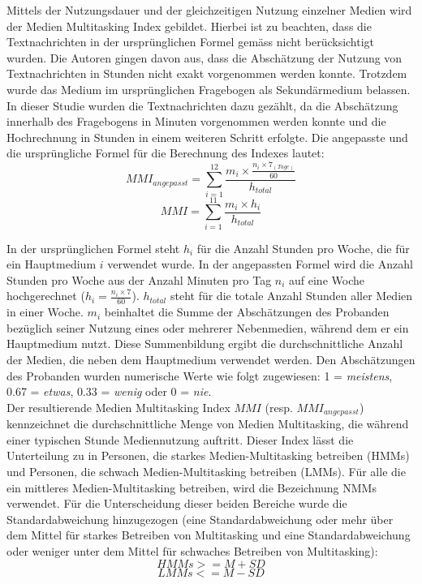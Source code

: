 Mittels der Nutzungsdauer und der gleichzeitigen Nutzung einzelner Medien wird der Medien Multitasking Index gebildet. Hierbei ist zu beachten, dass die Textnachrichten in der ursprünglichen Formel gemäss \cite{Ophir2009}  nicht berücksichtigt wurden. Die Autoren gingen davon aus, dass die Abschätzung der Nutzung von Textnachrichten in Stunden nicht exakt vorgenommen werden konnte. Trotzdem wurde das Medium im ursprünglichen Fragebogen als Sekundärmedium belassen. In dieser Studie wurden die Textnachrichten dazu gezählt, da die Abschätzung innerhalb des Fragebogens in Minuten vorgenommen werden konnte und die Hochrechnung in Stunden in einem weiteren Schritt erfolgte. Die angepasste und die ursprüngliche Formel für die Berechnung des Indexes lautet:
\begin{equation}\label{formel.mmiext}
    MMI_{angepasst}=\sum_{i=1}^{12} \frac{m_{i} \times \frac{n_{i} \times 7_{(Tage)}}{60}}{h_{total}}
\end{equation}
\begin{equation}\label{formel.mmi}
    MMI=\sum_{i=1}^{11} \frac{m_{i} \times h_{i}}{h_{total}}
\end{equation}

In der ursprünglichen Formel steht \(h_{i}\) für die Anzahl Stunden pro Woche, die für ein Hauptmedium \(i\) verwendet wurde. In der angepassten Formel wird die Anzahl Stunden pro Woche aus der Anzahl Minuten pro Tag \(n_i\) auf eine Woche hochgerechnet (\(h_{i}=\frac{n_{i} \times 7}{60}\)). \(h_{total}\) steht für die totale Anzahl Stunden aller Medien in einer Woche. \(m_i\) beinhaltet die Summe der Abschätzungen des Probanden bezüglich seiner Nutzung eines oder mehrerer Nebenmedien, während dem er ein Hauptmedium nutzt. Diese Summenbildung ergibt die durchschnittliche Anzahl der Medien, die neben dem Hauptmedium verwendet werden. Den Abschätzungen des Probanden wurden numerische Werte wie folgt zugewiesen: 1 = \textit{meistens}, 0.67 = \textit{etwas}, 0.33 = \textit{wenig} oder 0 = \textit{nie}. \\
Der resultierende Medien Multitasking Index \(MMI\) (resp. \(MMI_{angepasst}\)) kennzeichnet die durchschnittliche Menge von Medien Multitasking, die während einer typischen Stunde Mediennutzung auftritt. Dieser Index lässt die Unterteilung zu in Personen, die starkes Medien-Multitasking betreiben (HMMs) und Personen, die schwach Medien-Multitasking betreiben (LMMs). Für alle die ein mittleres Medien-Multitasking betreiben, wird die Bezeichnung NMMs verwendet. Für die Unterscheidung dieser beiden Bereiche wurde die Standardabweichung hinzugezogen (eine Standardabweichung oder mehr über dem Mittel für starkes Betreiben von Multitasking und eine Standardabweichung oder weniger unter dem Mittel für schwaches Betreiben von Multitasking): 
\begin{equation}\label{formel.hmms}
    HMMs>=M+SD
\end{equation}
\begin{equation}\label{formel.hmms}
    LMMs<=M-SD
\end{equation}

